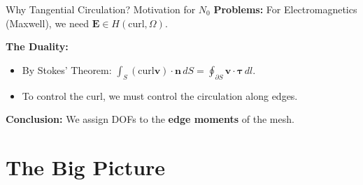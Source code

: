 \documentclass[aspectratio=169]{beamer}
\begin{document}
\begin{frame}{Why Tangential Circulation? Motivation for $N_0$}
    \textbf{Problems:} For Electromagnetics (Maxwell), we need $\bm{E} \in H(\text{curl}, \Omega)$.

    \vspace{0.2cm}
    \textbf{The Duality:}
    \begin{itemize}
        \item By Stokes' Theorem: $\int_S (\text{curl} \bm{v}) \cdot \bm{n} \, dS = \oint_{\partial S} \bm{v} \cdot \bm{\tau} \, dl$.
        \item To control the curl, we must control the circulation along edges.
    \end{itemize}

    \begin{center}
    \end{center}
    \textbf{Conclusion:} We assign DOFs to the \textbf{edge moments} of the mesh.
\end{frame}

\section{The Big Picture}
\end{document}
